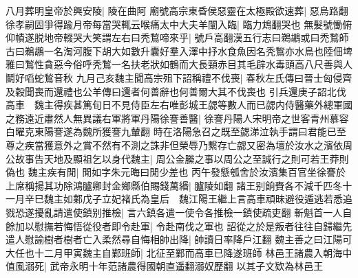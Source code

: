 八月葬明皇帝於興安陵|{
	陵在曲阿}
廟號高宗東昏侯惡靈在太極殿欲速葬|{
	惡烏路翻}
徐孝嗣固爭得踰月帝每當哭輒云喉痛太中大夫羊闡入臨|{
	臨力鴆翻哭也}
無髮號慟俯仰幘遂脱地帝輟哭大笑謂左右曰秃鶖啼來乎|{
	號戶高翻漢五行志曰鵜鶘或曰禿鶖師古曰鵜鶘一名淘河腹下胡大如數升囊好羣入澤中抒水食魚因名秃鶖亦水鳥也陸佃埤雅曰鶖性貪惡今俗呼秃鶖一名扶老狀如鶴而大長頸赤目其毛辟水毒頭高八尺善與人鬬好㗖蛇鶖音秋}
九月己亥魏主聞高宗殂下詔稱禮不伐喪|{
	春秋左氏傳曰晉士匈侵齊及穀聞喪而還禮也公羊傳曰還者何善辭也何善爾大其不伐喪也}
引兵還庚子詔北伐高車　魏主得疾甚篤旬日不見侍臣左右唯彭城王勰等數人而已勰内侍醫藥外總軍國之務遠近肅然人無異議右軍將軍丹陽徐謇善醫|{
	徐謇丹陽人宋明帝之世客青州慕容白曜克東陽謇遂為魏所獲謇九輦翻}
時在洛陽急召之既至勰涕泣執手謂曰君能已至尊之疾當獲意外之賞不然有不測之誅非但榮辱乃繫存亡勰又密為壇於汝水之濱依周公故事告天地及顯祖乞以身代魏主|{
	周公金縢之事以周公之至誠行之則可若王莽則偽也}
魏主疾有閒|{
	閒如字朱元晦曰閒少差也}
丙午發懸瓠舍於汝濱集百官坐徐謇於上席稱揚其功除鴻臚卿封金鄉縣伯賜錢萬緡|{
	臚陵如翻}
諸王别餉賚各不減千匹冬十一月辛巳魏主如鄴戊子立妃褚氏為皇后　魏江陽王繼上言高車頑昧避役遁逃若悉追戮恐遂擾亂請遣使鎮别推檢|{
	言六鎮各遣一使令各推檢一鎮使疏吏翻}
斬魁首一人自餘加以慰撫若悔悟從役者即令赴軍|{
	令赴南伐之軍也}
詔從之於是叛者往往自歸繼先遣人慰諭樹者樹者亡入柔然尋自悔相帥出降|{
	帥讀日率降戶江翻}
魏主善之曰江陽可大任也十二月甲寅魏主自鄴班師|{
	北征至鄴而高車已降遂班師}
林邑王諸農入朝海中值風溺死|{
	武帝永明十年范諸農得國朝直遥翻溺奴歷翻}
以其子文欵為林邑王

